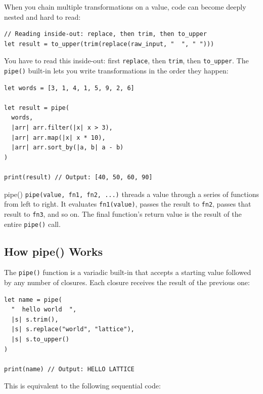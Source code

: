 When you chain multiple transformations on a value, code can become deeply nested and hard to read:

\begin{lstlisting}[language=Lattice, caption={Deeply nested function calls}]
// Reading inside-out: replace, then trim, then to_upper
let result = to_upper(trim(replace(raw_input, "  ", " ")))
\end{lstlisting}

You have to read this inside-out: first \lstinline|replace|, then \lstinline|trim|, then \lstinline|to_upper|. The \lstinline|pipe()| built-in lets you write transformations in the order they happen:

\begin{lstlisting}[language=Lattice, caption={Using pipe for clarity}]
let words = [3, 1, 4, 1, 5, 9, 2, 6]

let result = pipe(
  words,
  |arr| arr.filter(|x| x > 3),
  |arr| arr.map(|x| x * 10),
  |arr| arr.sort_by(|a, b| a - b)
)

print(result) // Output: [40, 50, 60, 90]
\end{lstlisting}

\begin{defnbox}{pipe()}
\lstinline|pipe(value, fn1, fn2, ...)| threads a value through a series of functions from left to right. It evaluates \lstinline|fn1(value)|, passes the result to \lstinline|fn2|, passes that result to \lstinline|fn3|, and so on. The final function's return value is the result of the entire \lstinline|pipe()| call.
\end{defnbox}

\subsection{How pipe() Works}\label{sec:pipe-mechanics}

The \lstinline|pipe()| function is a variadic built-in that accepts a starting value followed by any number of closures. Each closure receives the result of the previous one:

\begin{lstlisting}[language=Lattice, caption={Step-by-step pipe transformation}]
let name = pipe(
  "  hello world  ",
  |s| s.trim(),
  |s| s.replace("world", "lattice"),
  |s| s.to_upper()
)

print(name) // Output: HELLO LATTICE
\end{lstlisting}

This is equivalent to the following sequential code:

